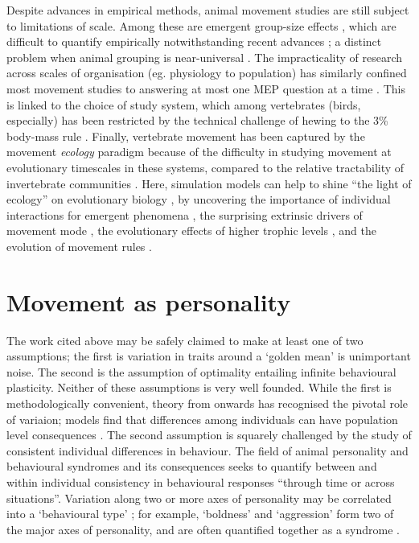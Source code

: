 Despite advances in empirical methods, animal movement studies are still subject to limitations of scale. Among these are emergent group-size effects \citep{tunstrom2013}, which are difficult to quantify empirically notwithstanding recent advances \citep{handegard2012, kays2015, strandburg-peshkin2015a, dhanjal-adams2018}; a distinct problem when animal grouping is near-universal \citep{krause2002}.
The impracticality of research across scales of organisation (eg. physiology to population) has similarly confined most movement studies to answering at most one MEP question at a time \citep[but see][]{fryxell2008, strandburg-peshkin2015a, curtin2018}.
This is linked to the choice of study system, which among vertebrates (birds, especially) has been restricted by the technical challenge of hewing to the 3\% body-mass rule \citep{naef-daenzer2001}.
Finally, vertebrate movement has been captured by the movement \emph{ecology} paradigm because of the difficulty in studying movement at evolutionary timescales in these systems, compared to the relative tractability of invertebrate communities \citep[see recent eco-evo ex.][]{venkateswaran2017}.
Here, simulation models can help to shine ``the light of ecology'' on evolutionary biology \citep{grant2008}, by uncovering the importance of individual interactions for emergent phenomena \citep[e.g.][]{hildenbrandt2010, tunstrom2013}, the surprising extrinsic drivers of movement mode \citep{guttal2012}, the evolutionary effects of higher trophic levels \citep{ioannou2012}, and the evolution of movement rules \citep{dejager2011, netz2017}.

\section{Movement as personality}

The work cited above may be safely claimed to make at least one of two assumptions; the first is variation in traits around a `golden mean' is unimportant noise. The second is the assumption of optimality \citep{fretwell1970} entailing infinite behavioural plasticity. Neither of these assumptions is very well founded. While the first is methodologically convenient, theory from \citet{darwin1859} onwards has recognised the pivotal role of variaion; models find that differences among individuals can have population level consequences \citep[e.g.][]{pruitt2011}. The second assumption is squarely challenged by the study of consistent individual differences in behaviour. The field of animal personality and behavioural syndromes \citep{sih2004, sih2004a} and its consequences \citep{dingemanse2005} seeks to quantify between and within individual consistency in behavioural responses ``through time or across situations''. Variation along two or more axes of personality \citep{reale2007} may be correlated into a `behavioural type' \citep[examples in][]{sih2008, bell2009}; for example, `boldness' and `aggression' form two of the major axes of personality, and are often quantified together as a syndrome \citep{carter2013}.

